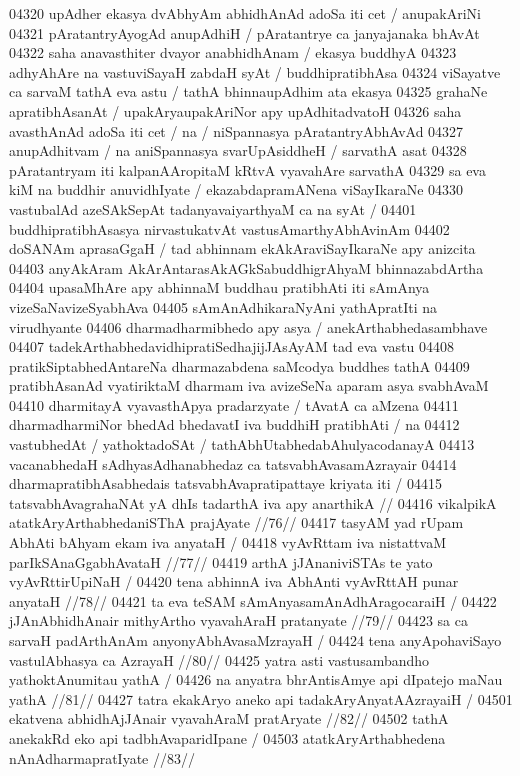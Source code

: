 04320 upAdher ekasya dvAbhyAm abhidhAnAd adoSa iti cet / anupakAriNi
04321 pAratantryAyogAd anupAdhiH / pAratantrye ca janyajanaka bhAvAt 
04322 saha anavasthiter dvayor anabhidhAnam / ekasya buddhyA
04323 adhyAhAre na vastuviSayaH zabdaH syAt / buddhipratibhAsa 
04324 viSayatve ca sarvaM tathA eva astu / tathA bhinnaupAdhim ata ekasya
04325 grahaNe apratibhAsanAt / upakAryaupakAriNor apy upAdhitadvatoH  
04326 saha avasthAnAd adoSa iti cet / na / niSpannasya pAratantryAbhAvAd 
04327 anupAdhitvam / na aniSpannasya svarUpAsiddheH / sarvathA asat  
04328 pAratantryam iti kalpanAAropitaM kRtvA vyavahAre sarvathA 
04329 sa eva kiM na buddhir anuvidhIyate / ekazabdapramANena viSayIkaraNe  
04330 vastubalAd azeSAkSepAt tadanyavaiyarthyaM ca na syAt /  
04401 buddhipratibhAsasya nirvastukatvAt vastusAmarthyAbhAvinAm  
04402 doSANAm aprasaGgaH / tad abhinnam ekAkAraviSayIkaraNe apy anizcita
04403 anyAkAram AkArAntarasAkAGkSabuddhigrAhyaM bhinnazabdArtha
04404 upasaMhAre apy abhinnaM buddhau pratibhAti iti sAmAnya vizeSaNavizeSyabhAva
04405 sAmAnAdhikaraNyAni yathApratIti na virudhyante
04406 dharmadharmibhedo apy asya / anekArthabhedasambhave  
04407 tadekArthabhedavidhipratiSedhajijJAsAyAM tad eva vastu 
04408 pratikSiptabhedAntareNa dharmazabdena saMcodya buddhes tathA  
04409 pratibhAsanAd vyatiriktaM dharmam iva avizeSeNa aparam asya svabhAvaM  
04410 dharmitayA vyavasthApya pradarzyate / tAvatA ca aMzena 
04411 dharmadharmiNor bhedAd bhedavatI iva buddhiH pratibhAti / na 
04412 vastubhedAt / yathoktadoSAt / tathAbhUtabhedabAhulyacodanayA
04413 vacanabhedaH sAdhyasAdhanabhedaz ca tatsvabhAvasamAzrayair 
04414 dharmapratibhAsabhedais tatsvabhAvapratipattaye kriyata iti / 
04415 	tatsvabhAvagrahaNAt yA dhIs tadarthA iva apy anarthikA //
04416 	vikalpikA atatkAryArthabhedaniSThA prajAyate //76//
04417 	tasyAM yad rUpam AbhAti bAhyam ekam iva anyataH /
04418 	vyAvRttam iva nistattvaM parIkSAnaGgabhAvataH //77// 
04419 	arthA jJAnaniviSTAs te yato vyAvRttirUpiNaH /  
04420 	tena abhinnA iva AbhAnti vyAvRttAH punar anyataH //78//
04421 	ta eva teSAM sAmAnyasamAnAdhAragocaraiH /
04422 	jJAnAbhidhAnair mithyArtho vyavahAraH pratanyate //79//
04423 	sa ca sarvaH padArthAnAm anyonyAbhAvasaMzrayaH /  
04424 	tena anyApohaviSayo vastulAbhasya ca AzrayaH //80// 
04425 	yatra asti vastusambandho yathoktAnumitau yathA / 
04426 	na anyatra bhrAntisAmye api dIpatejo maNau yathA //81//  
04427 	tatra ekakAryo aneko api tadakAryAnyatAAzrayaiH /  
04501 	ekatvena abhidhAjJAnair vyavahAraM pratAryate //82//
04502 	tathA anekakRd eko api tadbhAvaparidIpane /  
04503 	atatkAryArthabhedena nAnAdharmapratIyate //83//
